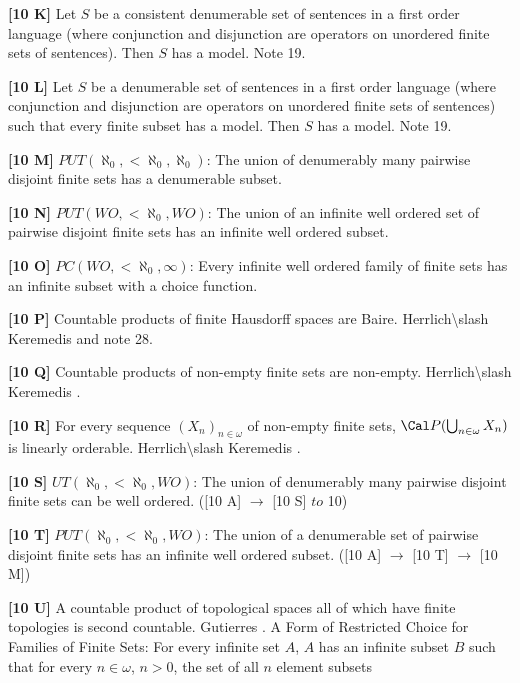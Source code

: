 \item{}{\bf [10 K]} Let $S$ be a consistent denumerable set of sentences
in a first order language (where conjunction and disjunction are
operators on unordered finite sets of sentences).  Then $S$
has a model. Note 19.
\smallskip
\item{}{\bf [10 L]}  Let $S$ be a denumerable set of sentences in a first
order language (where conjunction and disjunction are
operators on unordered finite sets of sentences) such that every
finite subset has a model.  Then $S$ has a model. Note 19.
\smallskip
\item{}{\bf [10 M]} $PUT(\aleph_0,<\aleph_0,\aleph_0)$: The union of
denumerably many pairwise disjoint finite sets has a denumerable
subset.
\smallskip
\item{}{\bf [10 N]} $PUT(WO,<\aleph_0,WO)$: The union of an infinite well
ordered set of pairwise disjoint finite sets has an infinite well
ordered subset.
\smallskip
\item{}{\bf [10 O]} $PC(WO,<\aleph_0,\infty)$: Every infinite well
ordered family of  finite sets has an infinite subset with a
choice function.
\smallskip
\item{}{\bf [10 P]} Countable products of finite Hausdorff spaces
are Baire. \ac{Herrlich\slash Keremedis} \cite{1999b} and note 28.
\smallskip
\item{}{\bf [10 Q]} Countable products of non-empty finite sets are
non-empty. \ac{Herrlich\slash Keremedis} \cite{1999b}.
\smallskip
\item{}{\bf [10 R]} For every sequence $(X_n)_{n\in\omega}$ of non-empty
finite sets, $\Cal P(\bigcup_{n\in\omega}X_n)$ is linearly orderable.
\ac{Herrlich\slash Keremedis} \cite{1999b}.
\smallskip
\item{}{\bf [10 S]}  $UT(\aleph_{0},<\aleph_{0},WO)$:  The
union of denumerably many pairwise disjoint finite sets can be well ordered. ([10 A]
$\to$ [10 S] $to$ 10)
\smallskip
\item{}{\bf [10 T]} $PUT(\aleph_0,<\aleph_0,WO)$: The union of a
denumerable set of pairwise disjoint finite sets has an infinite well ordered subset.
([10 A] $\to$ [10 T] $\to$ [10 M])
\smallskip
\item{}{\bf [10 U]} A countable product of topological spaces all of which
have finite topologies is second countable.  \ac{Gutierres} \cite{2004}.
\medskip
{}  A Form of Restricted Choice for Families of
Finite Sets:
For every infinite set $A$, $A$ has an infinite subset $B$ such
that for every $n\in\omega$, $n>0$, the set of all $n$ element subsets
